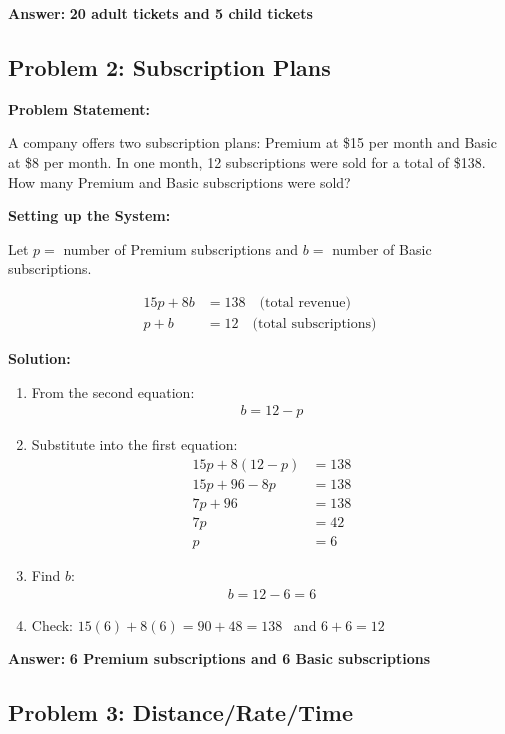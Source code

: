 \documentclass{article}
\begin{document}
\textbf{Answer:} \textbf{20 adult tickets and 5 child tickets} \,  

\subsection{Problem 2: Subscription Plans}

\textbf{Problem Statement:}

A company offers two subscription plans: Premium at \$15 per month and Basic at \$8 per month. In one month, 12 subscriptions were sold for a total of \$138. How many Premium and Basic subscriptions were sold?

\textbf{Setting up the System:}

Let $p =$ number of Premium subscriptions and $b =$ number of Basic subscriptions.

\begin{align*}
15p + 8b &= 138 \quad \text{(total revenue)} \\
p + b &= 12 \quad \text{(total subscriptions)}
\end{align*}

\textbf{Solution:}

\begin{enumerate}
    \item From the second equation:
    \begin{align*}
        b = 12 - p
    \end{align*}
    \item Substitute into the first equation:
    \begin{align*}
        15p + 8(12 - p) &= 138 \\
        15p + 96 - 8p &= 138 \\
        7p + 96 &= 138 \\
        7p &= 42 \\
        p &= 6
    \end{align*}
    \item Find $b$:
    \begin{align*}
        b = 12 - 6 = 6
    \end{align*}
    \item Check: $15(6) + 8(6) = 90 + 48 = 138$ \,  and $6 + 6 = 12$ \, 
\end{enumerate}

\textbf{Answer:} \textbf{6 Premium subscriptions and 6 Basic subscriptions} \,  

\subsection{Problem 3: Distance/Rate/Time}
\end{document}
